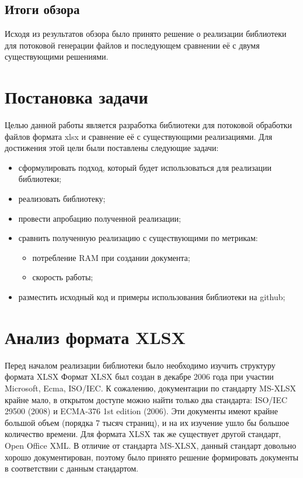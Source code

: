\documentclass[14pt]{matmex-diploma}
\begin{document}
\subsection{Итоги обзора}
    Исходя из результатов обзора было принято решение о реализации библиотеки для потоковой генерации файлов и последующем сравнении её с двумя существующими решениями.
    
\section{Постановка задачи}
Целью данной работы является разработка библиотеки для потоковой обработки файлов формата xlsx и сравнение её с существующими реализациями.
Для достижения этой цели были поставлены следующие задачи:
\begin{itemize}
    \item сформулировать подход, который будет использоваться для реализации библиотеки;
    \item реализовать библиотеку;
    \item провести апробацию полученной реализации;
    \item сравнить полученную реализацию с существующими по метрикам:
    \begin{itemize}
        \item потребление RAM при создании документа;
        \item скорость работы;
    \end{itemize}
    \item разместить исходный код и примеры использования библиотеки на github;
\end{itemize}

\section{Анализ формата XLSX}
Перед началом реализации библиотеки было необходимо изучить структуру формата XLSX
Формат XLSX был создан в декабре 2006 года при участии Microsoft, Ecma, ISO/IEC. К сожалению, документации по стандарту MS-XLSX крайне мало, в открытом доступе можно найти только два стандарта: ISO/IEC 29500 (2008) и ECMA-376 1st edition (2006). Эти документы имеют крайне большой объем (порядка 7 тысяч страниц), и на их изучение ушло бы большое количество времени. Для формата XLSX так же существует другой стандарт, Open Office XML. В отличие от стандарта MS-XLSX, данный стандарт довольно хорошо документирован, поэтому было принято решение формировать документы в соответствии с данным стандартом.
\end{document}
